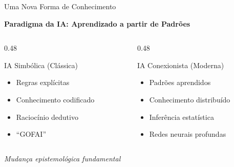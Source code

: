 \documentclass[aspectratio=169,12pt]{beamer}
\begin{document}
\begin{frame}{Uma Nova Forma de Conhecimento}
    \begin{center}
        \Large\textbf{Paradigma da IA: Aprendizado a partir de Padrões}
    \end{center}

    \vspace{0.5cm}

    \begin{columns}[T]
        \begin{column}{0.48\textwidth}
            \begin{block}{IA Simbólica (Clássica)}
                \begin{itemize}
                    \item Regras explícitas
                    \item Conhecimento codificado
                    \item Raciocínio dedutivo
                    \item ``GOFAI''
                \end{itemize}
            \end{block}
        \end{column}
        \begin{column}{0.48\textwidth}
            \begin{block}{IA Conexionista (Moderna)}
                \begin{itemize}
                    \item Padrões aprendidos
                    \item Conhecimento distribuído
                    \item Inferência estatística
                    \item Redes neurais profundas
                \end{itemize}
            \end{block}
        \end{column}
    \end{columns}

    \vspace{0.5cm}
    \begin{center}
        \textit{Mudança epistemológica fundamental}
    \end{center}
\end{frame}
\end{document}
